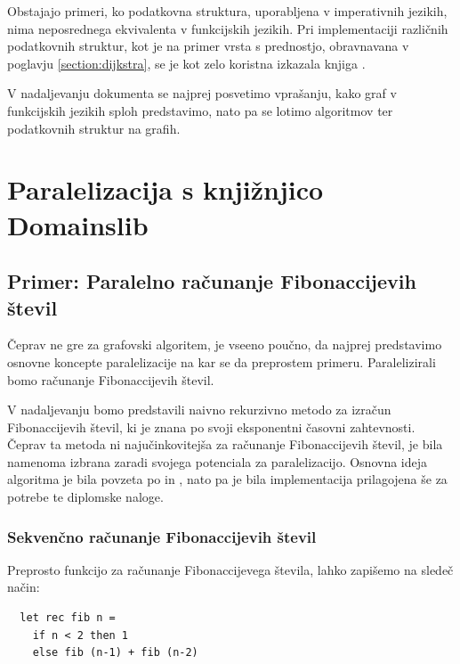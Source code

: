 \documentclass[fin1, tisk]{fmfdelo}
\begin{document}
Obstajajo primeri, ko podatkovna struktura, uporabljena v imperativnih jezikih, nima neposrednega ekvivalenta v funkcijskih jezikih.
Pri implementaciji različnih podatkovnih struktur, kot je na primer vrsta s prednostjo, obravnavana v poglavju \ref{section:dijkstra},
se je kot zelo koristna izkazala knjiga \cite{okasaki1996}.

V nadaljevanju dokumenta se najprej posvetimo vprašanju, kako graf v funkcijskih jezikih sploh predstavimo, 
nato pa se lotimo algoritmov ter podatkovnih struktur na grafih.


\section{Paralelizacija s knjižnjico Domainslib}


\subsection{Primer: Paralelno računanje Fibonaccijevih števil}

Čeprav ne gre za grafovski algoritem, je vseeno poučno, da najprej predstavimo osnovne koncepte
paralelizacije na kar se da preprostem primeru. Paralelizirali bomo računanje Fibonaccijevih števil.

V nadaljevanju bomo predstavili naivno rekurzivno metodo za izračun Fibonaccijevih števil, ki je znana po svoji eksponentni časovni zahtevnosti.
Čeprav ta metoda ni najučinkovitejša za računanje Fibonaccijevih števil, je bila namenoma izbrana zaradi svojega potenciala za paralelizacijo.
Osnovna ideja algoritma je bila povzeta po \cite{parallel_fib_computation} in \cite{multicore_ocaml_article},
nato pa je bila implementacija prilagojena še za potrebe te diplomske naloge. 

\subsubsection{Sekvenčno računanje Fibonaccijevih števil}

Preprosto funkcijo za računanje Fibonaccijevega števila, lahko zapišemo na sledeč način:

\begin{lstlisting}
  let rec fib n =
    if n < 2 then 1
    else fib (n-1) + fib (n-2)
\end{lstlisting}
\end{document}
